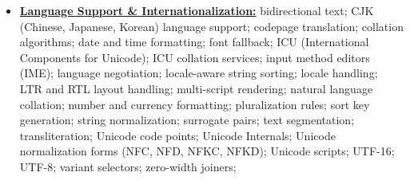 \documentclass[letterpaper,11pt]{article}
\begin{document}
\begin{multicols}{3}
{\begin{itemize}[leftmargin=0.1in, label={}, itemsep=0pt, parsep=0pt, topsep=0pt, partopsep=0pt]
\item
    \textbf{\uline{Language Support \& Internationalization:}} \hspace{0pt}
    bidirectional text;
    CJK (Chinese, Japanese, Korean) language support;
    codepage translation;
    collation algorithms;
    date and time formatting;
    font fallback;
    ICU (International Components for Unicode);
    ICU collation services;
    input method editors (IME);
    language negotiation;
    locale-aware string sorting;
    locale handling;
    LTR and RTL layout handling;
    multi-script rendering;
    natural language collation;
    number and currency formatting;
    pluralization rules;
    sort key generation;
    string normalization;
    surrogate pairs;
    text segmentation;
    transliteration;
    Unicode code points;
    Unicode Internals;
    Unicode normalization forms (NFC, NFD, NFKC, NFKD);
    Unicode scripts;
    UTF-16;
    UTF-8;
    variant selectors;
    zero-width joiners;


\end{itemize}}
\end{multicols}
\end{document}
